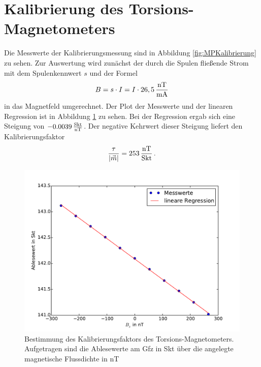\section{Kalibrierung des Torsions-Magnetometers}

Die Messwerte der Kalibrierungsmessung sind in Abbildung \ref{fig:MPKalibrierung} zu sehen. Zur Auswertung wird zunächst der durch die Spulen fließende Strom mit dem Spulenkennwert $s$ und der Formel
\begin{equation}
 B=s\cdot I=I\cdot 26,5\,\frac{\mathrm{nT}}{\mathrm{mA}} 
\end{equation}
in das Magnetfeld umgerechnet. Der Plot der Messwerte und der linearen Regression ist in Abbildung \ref{fig:kalibrierung} zu sehen. Bei der Regression ergab sich eine Steigung von $-0.0039\,\frac{\mathrm{Skt}}{\mathrm{nT}}$. Der negative Kehrwert dieser Steigung liefert den Kalibrierungsfaktor
\begin{equation}
 \frac{\tau}{|\vec{m}|}=253\,\frac{\mathrm{nT}}{\mathrm{Skt}} \text{\,.}
\end{equation}

\begin{figure}
 \centering
 \includegraphics[width=\textwidth]{fig/kalibrierung.pdf}
 \caption[Bestimmung des Kalibrierungsfaktors des Torsions-Magnetometers]{Bestimmung des Kalibrierungsfaktors des Torsions-Magnetometers. Aufgetragen sind die Ablesewerte am Gfz in Skt über die angelegte magnetische Flussdichte in nT}
 \label{fig:kalibrierung}
\end{figure}


